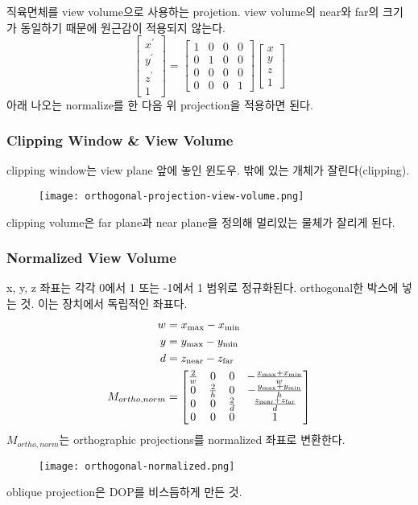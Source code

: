 직육면체를 view volume으로 사용하는 projetion. view volume의 near와 far의 크기가 동일하기 때문에 원근감이 적용되지 않는다.
$$
\begin{bmatrix}
  x^\prime \\
  y^\prime \\
  z^\prime \\
  1
\end{bmatrix}
=
\begin{bmatrix}
  1 & 0 & 0 & 0 \\
  0 & 1 & 0 & 0 \\
  0 & 0 & 0 & 0 \\
  0 & 0 & 0 & 1
\end{bmatrix}
\begin{bmatrix}
  x \\
  y \\
  z \\
  1
\end{bmatrix}
$$
아래 나오는 normalize를 한 다음 위 projection을 적용하면 된다.

\subsubsection{Clipping Window \& View Volume}

clipping window는 view plane 앞에 놓인 윈도우. 밖에 있는 개체가 잘린다(clipping).
\begin{figure}[h]
  \centering
  \texttt{[image: orthogonal-projection-view-volume.png]}
\end{figure}
clipping volume은 far plane과 near plane을 정의해 멀리있는 물체가 잘리게 된다.

\subsubsection{Normalized View Volume}

x, y, z 좌표는 각각 0에서 1 또는 -1에서 1 범위로 정규화된다. orthogonal한 박스에 넣는 것. 이는 장치에서 독립적인 좌표다.
$$
\begin{aligned}
  w &=  x_\text{max} - x_\text{min} \\
  y &= y_\text{max} - y_\text{min} \\
  d &= z_\text{near} - z_\text{far} \\
  M_{ortho, norm} &=
  \begin{bmatrix}
    {2 \over w} & 0 & 0 & -{x_\text{max} + x_\text{min} \over w} \\
    0 & {2 \over h} & 0 & -{y_\text{max} + y_\text{min} \over h} \\
    0 & 0 & {2 \over d} & {z_\text{near} + z_\text{far} \over d} \\
    0 & 0 & 0 & 1
  \end{bmatrix}
\end{aligned}
$$
$M_{ortho, norm}$는 orthographic projections를 normalized 좌표로 변환한다.
\begin{figure}[h]
  \centering
  \texttt{[image: orthogonal-normalized.png]}
\end{figure}
oblique projection은 DOP를 비스듬하게 만든 것.

